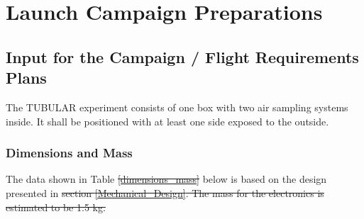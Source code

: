 \documentclass[a4paper,12pt,twoside, final]{article}
\providecommand{\DIFaddtex}[1]{{\protect\color{blue}\uwave{#1}}} %
\providecommand{\DIFdeltex}[1]{{\protect\color{red}\sout{#1}}}                      %
\providecommand{\DIFaddbegin}{} %
\providecommand{\DIFaddend}{} %
\providecommand{\DIFdelbegin}{} %
\providecommand{\DIFdelend}{} %
\providecommand{\DIFadd}[1]{\texorpdfstring{\DIFaddtex{#1}}{#1}} %
\providecommand{\DIFdel}[1]{\texorpdfstring{\DIFdeltex{#1}}{}} %
\newcommand{\DIFscaledelfig}{0.5}
\newlength{\DIFdelgraphicswidth} %
\newlength{\DIFdelgraphicsheight} %
\newcommand{\DIFaddincludegraphics}[2][]{{\color{blue}\fbox{\DIFOincludegraphics[#1]{#2}}}} %
\newcommand{\DIFdelincludegraphics}[2][]{%
\sbox{\DIFdelgraphicsbox}{\DIFOincludegraphics[#1]{#2}}%
\settoboxwidth{\DIFdelgraphicswidth}{\DIFdelgraphicsbox} %
\settoboxtotalheight{\DIFdelgraphicsheight}{\DIFdelgraphicsbox} %
\scalebox{\DIFscaledelfig}{%
\parbox[b]{\DIFdelgraphicswidth}{\usebox{\DIFdelgraphicsbox}\\[-\baselineskip] \rule{\DIFdelgraphicswidth}{0em}}\llap{\resizebox{\DIFdelgraphicswidth}{\DIFdelgraphicsheight}{%
\setlength{\unitlength}{\DIFdelgraphicswidth}%
\begin{picture}(1,1)%
\thicklines\linethickness{2pt} %
{\color[rgb]{1,0,0}\put(0,0){\framebox(1,1){}}}%
{\color[rgb]{1,0,0}\put(0,0){\line( 1,1){1}}}%
{\color[rgb]{1,0,0}\put(0,1){\line(1,-1){1}}}%
\end{picture}%
}\hspace*{3pt}}} %
} %
\DeclareRobustCommand{\DIFaddbegin}{\DIFOaddbegin \let\includegraphics\DIFaddincludegraphics} %
\DeclareRobustCommand{\DIFaddend}{\DIFOaddend \let\includegraphics\DIFOincludegraphics} %
\DeclareRobustCommand{\DIFdelbegin}{\DIFOdelbegin \let\includegraphics\DIFdelincludegraphics} %
\DeclareRobustCommand{\DIFdelend}{\DIFOaddend \let\includegraphics\DIFOincludegraphics} %
\begin{document}

\DIFaddend \pagebreak
\section{Launch Campaign Preparations}
\subsection{Input for the Campaign / Flight Requirements Plans}

The TUBULAR experiment consists of one box with two air sampling systems inside. It shall be positioned with at least one side exposed to the outside.

\subsubsection{Dimensions and Mass}

The data shown in Table \DIFdelbegin \DIFdel{\ref{dimensions_mass} }\DIFdelend \DIFaddbegin \DIFadd{\ref{tab:dim-mass-tab} }\DIFaddend below is based on the design presented in \DIFdelbegin \DIFdel{section \ref{Mechanical_Design}. The mass for the electronics is estimated to be 1.5 kg.  
}\DIFdelend \DIFaddbegin \DIFadd{Section \ref{Mechanical_Design}. %
}\DIFaddend 
\end{document}

